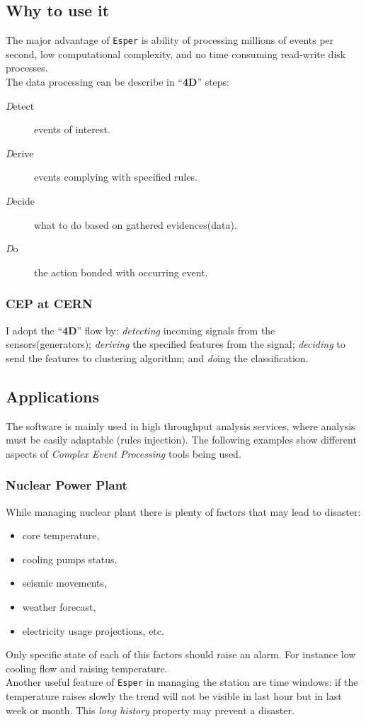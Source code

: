 \documentclass[11pt, letterpaper]{article}            %
\begin{document}
\subsection{Why to use it}
The major advantage of \texttt{Esper} is ability of processing millions of events per second, low computational complexity, and no time consuming read-write disk processes.\\
The data processing can be describe in ``\textbf{4D}'' steps:
\begin{description}
\item[\textit{D}etect] events of interest.
\item [\textit{D}erive] events complying with specified rules.
\item [\textit{D}ecide] what to do based on gathered evidences(data).
\item [\textit{D}o] the action bonded with occurring event.
\end{description}

\subsubsection{CEP at CERN}
I adopt the ``\textbf{4D}'' flow by: \emph{detecting} incoming signals from the sensors(generators); \emph{deriving} the specified features from the signal; \emph{deciding} to send the features to clustering algorithm; and \emph{do}ing the classification.

\subsection{Applications}
The software is mainly used in high throughput analysis services, where analysis must be easily adaptable (rules injection). The following examples show different aspects of \emph{Complex Event Processing} tools being used.
\subsubsection{Nuclear Power Plant}
While managing nuclear plant there is plenty of factors that may lead to disaster:
\begin{itemize}
\item core temperature,
\item cooling pumps status,
\item seismic movements,
\item weather forecast,
\item electricity usage projections, etc.
\end{itemize}
Only specific state of each of this factors should raise an alarm. For instance low cooling flow and raising temperature.\\
Another useful feature of \texttt{Esper} in managing the station are time windows: if the temperature raises slowly the trend will not be visible in last hour but in last week or month. This \emph{long history} property may prevent a disaster.
\end{document}
